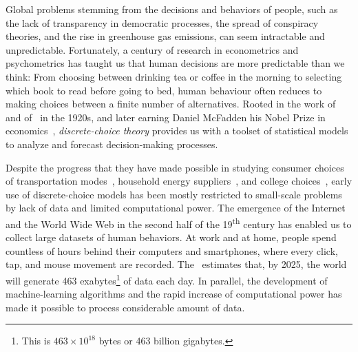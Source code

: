 Global problems stemming from the decisions and behaviors of people, such as the lack of transparency in democratic processes, the spread of conspiracy theories, and the rise in greenhouse gas emissions, can seem intractable and unpredictable.
Fortunately, a century of research in econometrics and psychometrics has taught us that human decisions are more predictable than we think:
From choosing between drinking tea or coffee in the morning to selecting which book to read before going to bed, human behaviour often reduces to making choices between a finite number of alternatives.
Rooted in the work of~\citet{thurstone1927law} and of~\citet{zermelo1928berechnung} in the 1920s, and later earning Daniel McFadden his Nobel Prize in economics~\citep{mcfadden2001economic}, \emph{discrete-choice theory} provides us with a toolset of statistical models to analyze and forecast decision-making processes.

Despite the progress that they have made possible in studying consumer choices of transportation modes~\citep{ben1973structure,mcfadden1974measurement}, household energy suppliers~\citep{goett2000customers}, and college choices~\citep{fuller1982new}, early use of discrete-choice models has been mostly restricted to small-scale problems by lack of data and limited computational power.
The emergence of the Internet and the World Wide Web in the second half of the 19\textsuperscript{th} century has enabled us to collect large datasets of human behaviors.
At work and at home, people spend countless of hours behind their computers and smartphones, where every click, tap, and mouse movement are recorded.
The~\citet{wef2019data} estimates that, by 2025, the world will generate 463 exabytes\footnote{This is $463 \times 10^{18}$ bytes or 463 billion gigabytes.} of data each day.
In parallel, the development of machine-learning algorithms and the rapid increase of computational power has made it possible to process considerable amount of data.

